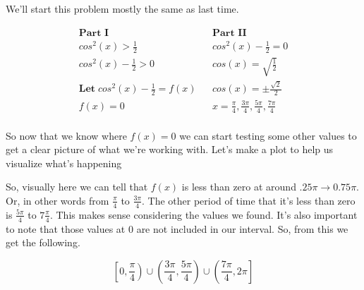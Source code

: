 \documentclass[10pt,letterpaper]{amspset}
\begin{document}
\begin{solution}
    We'll start this problem mostly the same as last time. 
    
    \begin{align}
        \textbf{Part I} && \textbf{Part II} \\
        cos^2(x) > \frac{1}{2} && cos^2(x) - \frac{1}{2} = 0 \\
        cos^2(x) - \frac{1}{2} > 0 && cos(x) = \sqrt{\frac{1}{2}} \\
        \textbf{Let} \; cos^2(x) - \frac{1}{2} = f(x) && cos(x) = \pm \frac{\sqrt{2}}{2} \\
        f(x) = 0 && x = \frac{\pi}{4}, \frac{3\pi}{4}, \frac{5\pi}{4}, \frac{7\pi}{4} \\
    \end{align}
    
    So now that we know where $f(x) = 0$ we can start testing some other values to get a clear picture of what we're working with. Let's make a plot to help us visualize what's happening
    
    
    
    So, visually here we can tell that $f(x)$ is less than zero at around $.25\pi \rightarrow 0.75\pi$. Or, in other words from $\frac{\pi}{4}$ to $\frac{3\pi}{4}$. The other period of time that it's less than zero is $\frac{5\pi}{4}$ to $7\frac{\pi}{4}$. This makes sense considering the values we found. It's also important to note that those values at 0 are not included in our interval. So, from this we get the following.
    
    \[\boxed{ \left[ 0, \frac{\pi}{4}\right) \cup \left( \frac{3\pi}{4}, \frac{5\pi}{4}\right) \cup \left( \frac{7\pi}{4}, 2\pi \right]  }\]
\end{solution}


\pagebreak
\end{document}
